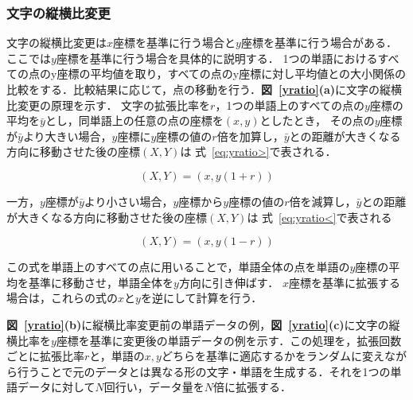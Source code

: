 \subsubsection{文字の縦横比変更}
文字の縦横比変更は$x$座標を基準に行う場合と$y$座標を基準に行う場合がある．
ここでは$y$座標を基準に行う場合を具体的に説明する．
1つの単語におけるすべての点のy座標の平均値を取り，すべての点のy座標に対し平均値との大小関係の比較をする．比較結果に応じて，点の移動を行う．\textbf{図~\ref{yratio}(a)}に文字の縦横比変更の原理を示す．
文字の拡張比率を$r$，1つの単語上のすべての点の$y$座標の平均を$\bar{y}$とし，同単語上の任意の点の座標を$(x, y)$としたとき，
その点の$y$座標が$\bar{y}$より大きい場合，$y$座標に$y$座標の値の$r$倍を加算し，$\bar{y}$との距離が大きくなる方向に移動させた後の座標$(X, Y)$は 式~\ref{eq:yratio>}で表される．

\begin{equation}
  (X, Y) = (x, y(1+r))
  \label{eq:yratio>}
\end{equation}

一方，$y$座標が$\bar{y}$より小さい場合，$y$座標から$y$座標の値の$r$倍を減算し，$\bar{y}$との距離が大きくなる方向に移動させた後の座標$(X, Y)$は 式~\ref{eq:yratio<}で表される

\begin{equation}
  (X, Y) = (x, y(1-r))
  \label{eq:yratio<}
\end{equation}

この式を単語上のすべての点に用いることで，単語全体の点を単語の$y$座標の平均を基準に移動させ，単語全体を$y$方向に引き伸ばす．
$x$座標を基準に拡張する場合は，これらの式の$x$と$y$を逆にして計算を行う．


\textbf{図~\ref{yratio}(b)}に縦横比率変更前の単語データの例，\textbf{図~\ref{yratio}(c)}に文字の縦横比率を$y$座標を基準に変更後の単語データの例を示す．この処理を，拡張回数ごとに拡張比率$r$と，単語の$x,y$どちらを基準に適応するかをランダムに変えながら行うことで元のデータとは異なる形の文字・単語を生成する．それを1つの単語データに対して$N$回行い，データ量を$N$倍に拡張する．

